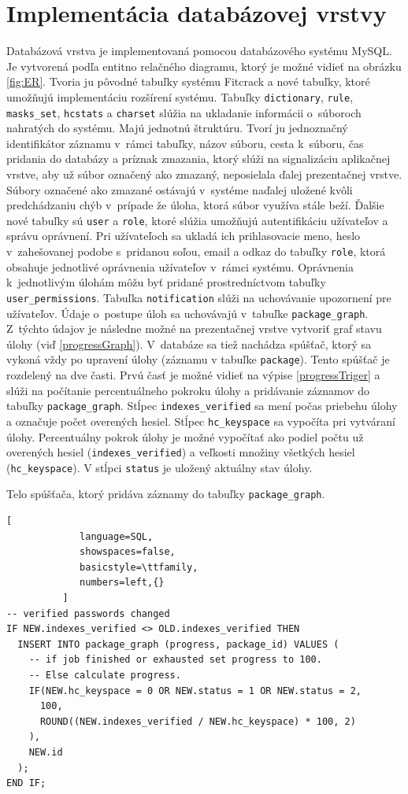 \documentclass[zadani,slovak]{fitthesis}
\begin{document}
\section{Implementácia databázovej vrstvy}
Databázová vrstva je implementovaná pomocou databázového systému MySQL. Je vytvorená podľa entitno relačného diagramu, ktorý je možné vidieť na obrázku \ref{fig:ER}. Tvoria ju pôvodné tabuľky systému Fitcrack a nové tabuľky, ktoré umožňujú implementáciu rozšírení systému. Tabuľky \texttt{dictionary}, \texttt{rule}, \texttt{masks\_set}, \texttt{hcstats} a \texttt{charset} slúžia na ukladanie informácii o~súboroch nahratých do systému. Majú jednotnú štruktúru. Tvorí ju jednoznačný identifikátor záznamu v~rámci tabuľky, názov súboru, cesta k~súboru, čas pridania do databázy a príznak zmazania, ktorý slúži na signalizáciu aplikačnej vrstve, aby už súbor označený ako zmazaný, neposielala ďalej prezentačnej vrstve. Súbory označené ako zmazané ostávajú v~systéme naďalej uložené kvôli predchádzaniu chýb v~prípade že úloha, ktorá súbor využíva stále beží. Ďalšie nové tabuľky sú \texttt{user} a \texttt{role}, ktoré slúžia umožňujú autentifikáciu užívateľov a správu oprávnení. Pri užívateľoch sa ukladá ich prihlasovacie meno, heslo v~zahešovanej podobe s~pridanou soľou, email a odkaz do tabuľky \texttt{role}, ktorá obsahuje jednotlivé oprávnenia užívateľov v~rámci systému. Oprávnenia k~jednotlivým úlohám môžu byť pridané prostredníctvom tabuľky \texttt{user\_permissions}. Tabuľka \texttt{notification} slúži na uchovávanie upozornení pre užívateľov. Údaje o~postupe úloh sa uchovávajú v~tabuľke \texttt{package\_graph}. Z~týchto údajov je následne možné na prezentačnej vrstve vytvoriť graf stavu úlohy (viď \ref{progressGraph}). V~databáze sa tiež nachádza spúšťač, ktorý sa vykoná vždy po upravení úlohy (záznamu v tabuľke \texttt{package}). Tento spúšťač je rozdelený na dve časti. Prvú časť je možné vidieť na výpise \ref{progressTriger} a slúži na počítanie percentuálneho pokroku úlohy a pridávanie záznamov do tabuľky \texttt{package\_graph}. Stĺpec \texttt{indexes\_verified} sa mení počas priebehu úlohy a označuje počet overených hesiel. Stĺpec \texttt{hc\_keyspace} sa vypočíta pri vytváraní úlohy. Percentuálny pokrok úlohy je možné vypočítať ako podiel počtu už overených hesiel (\texttt{indexes\_verified}) a veľkosti množiny všetkých hesiel (\texttt{hc\_keyspace}). V stĺpci \texttt{status} je uložený aktuálny stav úlohy.
\begin{algorithm}
  \caption{Telo spúšťača, ktorý pridáva záznamy do tabuľky \texttt{package\_graph}.}
  \label{progressTriger}
  \begin{lstlisting}[
             language=SQL,
             showspaces=false,
             basicstyle=\ttfamily,
             numbers=left,{}
          ]
-- verified passwords changed
IF NEW.indexes_verified <> OLD.indexes_verified THEN
  INSERT INTO package_graph (progress, package_id) VALUES (
    -- if job finished or exhausted set progress to 100. 
    -- Else calculate progress.
    IF(NEW.hc_keyspace = 0 OR NEW.status = 1 OR NEW.status = 2,
      100,
      ROUND((NEW.indexes_verified / NEW.hc_keyspace) * 100, 2)
    ),
    NEW.id  
  );
END IF;
  \end{lstlisting}
\end{algorithm}
\end{document}
